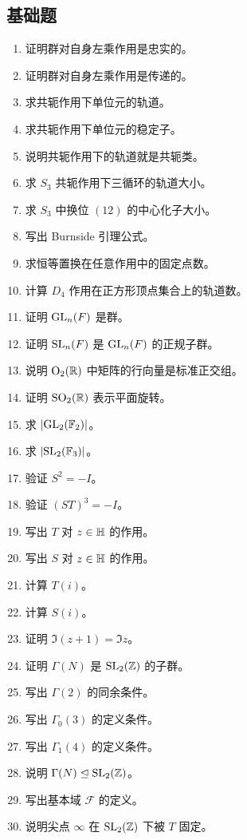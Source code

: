 \subsection*{基础题}
\begin{enumerate}[label=\textbf{\arabic*.}, leftmargin=*, itemsep=0.5em]
\item \basic 证明群对自身左乘作用是忠实的。
\item \basic 证明群对自身左乘作用是传递的。
\item \basic 求共轭作用下单位元的轨道。
\item \basic 求共轭作用下单位元的稳定子。
\item \basic 说明共轭作用下的轨道就是共轭类。
\item \basic 求 $S_3$ 共轭作用下三循环的轨道大小。
\item \basic 求 $S_3$ 中换位 $(12)$ 的中心化子大小。
\item \basic 写出 Burnside 引理公式。
\item \basic 求恒等置换在任意作用中的固定点数。
\item \basic 计算 $D_4$ 作用在正方形顶点集合上的轨道数。
\item \basic 证明 $\mathrm{GL}_n(F)$ 是群。
\item \basic 证明 $\mathrm{SL}_n(F)$ 是 $\mathrm{GL}_n(F)$ 的正规子群。
\item \basic 说明 $\mathrm{O}_2(\mathbb{R})$ 中矩阵的行向量是标准正交组。
\item \basic 证明 $\mathrm{SO}_2(\mathbb{R})$ 表示平面旋转。
\item \basic 求 $|\mathrm{GL}_2(\mathbb{F}_2)|$。
\item \basic 求 $|\mathrm{SL}_2(\mathbb{F}_3)|$。
\item \basic 验证 $S^2=-I$。
\item \basic 验证 $(ST)^3=-I$。
\item \basic 写出 $T$ 对 $z\in\mathbb{H}$ 的作用。
\item \basic 写出 $S$ 对 $z\in\mathbb{H}$ 的作用。
\item \basic 计算 $T(i)$。
\item \basic 计算 $S(i)$。
\item \basic 证明 $\Im(z+1)=\Im z$。
\item \basic 证明 $\Gamma(N)$ 是 $\mathrm{SL}_2(\mathbb{Z})$ 的子群。
\item \basic 写出 $\Gamma(2)$ 的同余条件。
\item \basic 写出 $\Gamma_0(3)$ 的定义条件。
\item \basic 写出 $\Gamma_1(4)$ 的定义条件。
\item \basic 说明 $\Gamma(N)\trianglelefteq \mathrm{SL}_2(\mathbb{Z})$。
\item \basic 写出基本域 $\mathcal F$ 的定义。
\item \basic 说明尖点 $\infty$ 在 $\mathrm{SL}_2(\mathbb{Z})$ 下被 $T$ 固定。
\end{enumerate}
